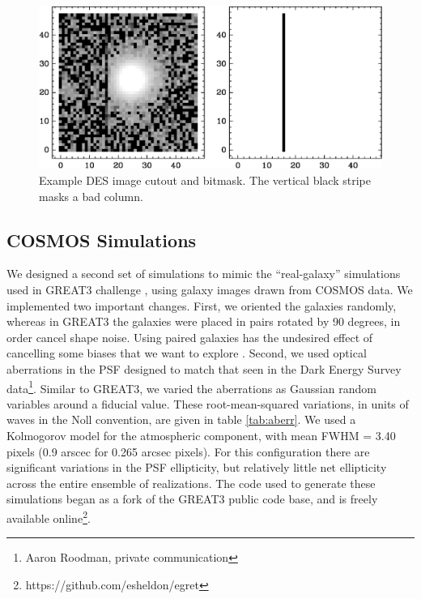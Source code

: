 \documentclass[usegraphicx,usenatbib]{mn2e}
\begin{document}
\begin{figure}
    \centering
    \includegraphics[scale=0.45]{DES2117+0126-bmask-021223.eps}

    \caption{Example DES image cutout and bitmask.  The vertical black stripe masks a
bad column. }

\label{fig:mask}
\end{figure}


\subsection{COSMOS Simulations} \label{sec:cosmosim}

We designed a second set of simulations to mimic the ``real-galaxy''
simulations used in GREAT3 challenge \citep{great3}, using galaxy images drawn
from COSMOS data.  We implemented two important changes.  First, we oriented
the galaxies randomly, whereas in GREAT3 the galaxies were placed in pairs
rotated by 90 degrees, in order cancel shape noise.  Using paired galaxies has
the undesired effect of cancelling some biases that we want to
explore \citep{DESSVShear}.  Second, we used optical aberrations in the PSF
designed to match that seen in the Dark Energy Survey data\footnote{Aaron
Roodman, private communication}.  Similar to GREAT3, we varied the aberrations
as Gaussian random variables around a fiducial value. These root-mean-squared variations, in
units of waves in the Noll convention, are given in table \ref{tab:aberr}.  We
used a Kolmogorov model for the atmospheric component, with mean FWHM = 3.40
pixels (0.9 arscec for 0.265 arcsec pixels).  For this configuration there are
significant variations in the PSF ellipticity, but relatively little net
ellipticity across the entire ensemble of realizations.  The code used to
generate these simulations began as a fork of the GREAT3 public code base, and
is freely available online\footnote{https://github.com/esheldon/egret}.
\end{document}

